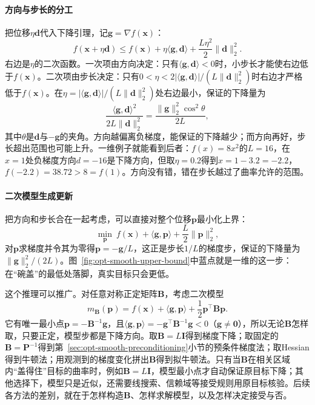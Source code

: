 \paragraph{方向与步长的分工}
把位移$\eta\bm d$代入下降引理，记$\bm g=\nabla f(\bm x)$：
\begin{equation}
\label{eq:opt-smooth-direction-step}
  f(\bm x+\eta\bm d)\leq f(\bm x)+\eta\langle\bm g,\bm d\rangle+\frac{L\eta^2}{2}\lVert\bm d\rVert_2^2 .
\end{equation}
右边是$\eta$的二次函数。一次项由方向决定：只有$\langle\bm g,\bm d\rangle<0$时，小步长才能使右边低于$f(\bm x)$。二次项由步长决定：只有$0<\eta<2|\langle\bm g,\bm d\rangle|/(L\lVert\bm d\rVert_2^2)$时右边才严格低于$f(\bm x)$。在$\eta=|\langle\bm g,\bm d\rangle|/(L\lVert\bm d\rVert_2^2)$处右边最小，保证的下降量为
\[
  \frac{\langle\bm g,\bm d\rangle^2}{2L\lVert\bm d\rVert_2^2}=\frac{\lVert\bm g\rVert_2^2\cos^2\theta}{2L},
\]
其中$\theta$是$\bm d$与$-\bm g$的夹角。方向越偏离负梯度，能保证的下降越少；而方向再好，步长超出范围也可能上升。一维例子就能看到后者：$f(x)=8x^2$的$L=16$，在$x=1$处负梯度方向$d=-16$是下降方向，但取$\eta=0.2$得到$x=1-3.2=-2.2$，$f(-2.2)=38.72>8=f(1)$。方向没有错，错在步长越过了曲率允许的范围。

\paragraph{二次模型生成更新}
把方向和步长合在一起考虑，可以直接对整个位移$\bm p$最小化上界：
\[
  \min_{\bm p}\ f(\bm x)+\langle\bm g,\bm p\rangle+\frac L2\lVert\bm p\rVert_2^2 ,
\]
对$\bm p$求梯度并令其为零得$\bm p=-\bm g/L$，这正是步长$1/L$的梯度步，保证的下降量为$\lVert\bm g\rVert_2^2/(2L)$。图~\ref{fig:opt-smooth-upper-bound}中蓝点就是一维的这一步：在“碗盖”的最低处落脚，真实目标只会更低。

这个推理可以推广。对任意对称正定矩阵$\bm B$，考虑二次模型
\begin{equation}
\label{eq:opt-smooth-quadratic-model}
  m_{\bm B}(\bm p)=f(\bm x)+\langle\bm g,\bm p\rangle+\frac12\bm p^\top\bm B\bm p .
\end{equation}
它有唯一最小点$\bm p=-\bm B^{-1}\bm g$，且$\langle\bm g,\bm p\rangle=-\bm g^\top\bm B^{-1}\bm g<0$（$\bm g\neq\bm0$），所以无论$\bm B$怎样取，只要正定，模型步都是下降方向。取$\bm B=L\bm I$得到梯度下降；取固定的$\bm B=\bm P^{-1}$得到第~\ref{sec:opt-smooth-preconditioning}小节的预条件梯度法；取Hessian得到牛顿法；用观测到的梯度变化拼出$\bm B$得到拟牛顿法。只有当$\bm B$在相关区域内“盖得住”目标的曲率时，例如$\bm B=L\bm I$，模型最小点才自动保证原目标下降；其他选择下，模型只是近似，还需要线搜索、信赖域等接受规则用原目标核验。后续各方法的差别，就在于怎样构造$\bm B$、怎样求解模型，以及怎样决定接受与否。
